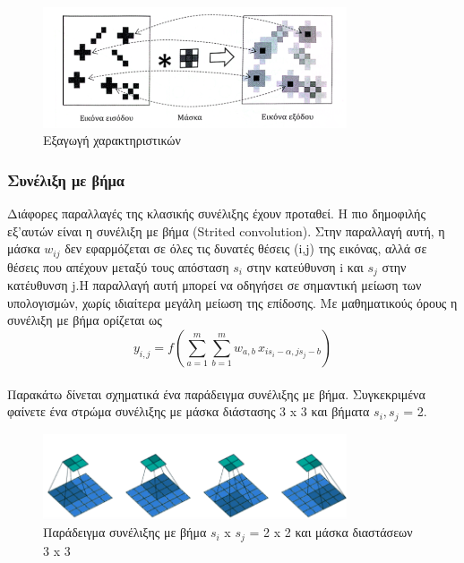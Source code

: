 \documentclass[12pt]{article}
\numberwithin{equation}{section}
\begin{document}
\begin{figure}[h!]
  \centering
  \includegraphics[width=0.8\textwidth]{images/Feature_extraction.png} %
  \caption{Εξαγωγή χαρακτηριστικών}
  \label{figure 20}
\end{figure} 

\subsubsection{Συνέλιξη με βήμα}

Διάφορες παραλλαγές της κλασικής συνέλιξης έχουν προταθεί. Η πιο δημοφιλής εξ'αυτών είναι η συνέλιξη με βήμα (Strited convolution). Στην παραλλαγή αυτή, η μάσκα \(w_{ij}\) δεν εφαρμόζεται σε όλες τις δυνατές θέσεις (i,j) της εικόνας, αλλά σε θέσεις που απέχουν μεταξύ τους απόσταση \(s_{i}\) στην κατεύθυνση i και \(s_{j}\) στην κατέυθυνση j.Η παραλλαγή αυτή μπορεί να οδηγήσει σε σημαντική μείωση των υπολογισμών, χωρίς ιδιαίτερα μεγάλη μείωση της επίδοσης. Με μαθηματικούς όρους η συνέλιξη με βήμα ορίζεται ως\\

\begin{equation}
y_{i,j} = f\left( \sum_{a=1}^{m} \sum_{b=1}^{m} w_{a,b} \, x_{is_i-\alpha, js_j-b} \right)
\end{equation}\\

Παρακάτω δίνεται σχηματικά ένα παράδειγμα συνέλιξης με βήμα. Συγκεκριμένα φαίνετε ένα στρώμα συνέλιξης με μάσκα διάστασης 3 x 3 και βήματα \(s_i, s_j\) = 2.\\

\begin{figure}[h!]
  \centering
  \includegraphics[width=0.8\textwidth]{images/Strited_conv.png} %
  \caption{Παράδειγμα συνέλιξης με βήμα \(s_i\) x \(s_j\) = 2 x 2 και μάσκα διαστάσεων 3 x 3}
  \label{figure 21}
\end{figure} 
\end{document}

